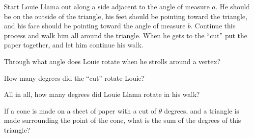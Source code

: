 Start Louie Llama out along a side adjacent to the angle of measure
$a$. He should be on the outside of the triangle, his feet should be
pointing toward the triangle, and his face should be pointing toward
the angle of measure $b$. Continue this process and walk him all
around the triangle. When he gets to the ``cut'' put the paper
together, and let him continue his walk.

\begin{prob} 
Through what angle does Louie rotate when he strolls around a vertex?
\end{prob}

\begin{prob}
How many degrees did the ``cut'' rotate Louie? 
\end{prob}

\begin{prob} 
All in all, how many degrees did Louie Llama rotate in his walk?
\end{prob}


\begin{prob}
If a cone is made on a sheet of paper with a cut of $\theta$ degrees,
and a triangle is made surrounding the point of the cone, what is the
sum of the degrees of this triangle?
\end{prob}




